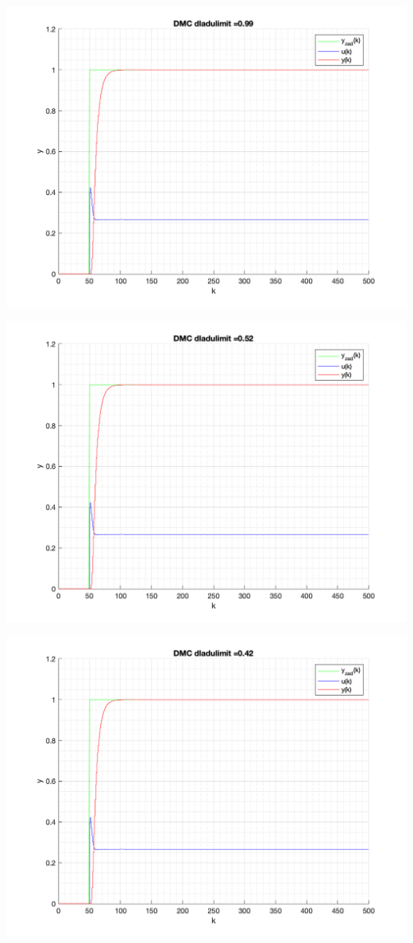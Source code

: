 \documentclass[a4paper, 11pt]{article}
\begin{document}
\begin{enumerate}
 \includegraphics[width=\linewidth]{./ModelsP6_dulimit/P4_DMC_dulimit_0_99_png.png} 
 
 \includegraphics[width=\linewidth]{./ModelsP6_dulimit/P4_DMC_dulimit_0_52_png.png} 
 
 \includegraphics[width=\linewidth]{./ModelsP6_dulimit/P4_DMC_dulimit_0_42_png.png} 
 

\end{enumerate}
\end{document}
